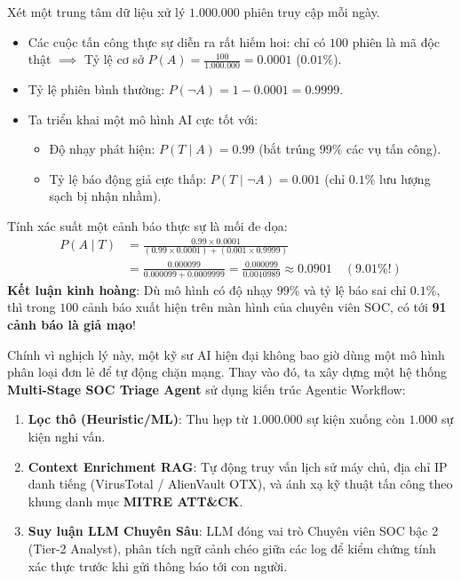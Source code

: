 \begin{example}
Xét một trung tâm dữ liệu xử lý $1.000.000$ phiên truy cập mỗi ngày.
\begin{itemize}
  \item Các cuộc tấn công thực sự diễn ra rất hiếm hoi: chỉ có $100$ phiên là mã độc thật $\implies$ Tỷ lệ cơ sở $P(A) = \frac{100}{1.000.000} = 0.0001$ ($0.01\%$).
  \item Tỷ lệ phiên bình thường: $P(\neg A) = 1 - 0.0001 = 0.9999$.
  \item Ta triển khai một mô hình AI cực tốt với:
    \begin{itemize}
      \item Độ nhạy phát hiện: $P(T \mid A) = 0.99$ (bắt trúng $99\%$ các vụ tấn công).
      \item Tỷ lệ báo động giả cực thấp: $P(T \mid \neg A) = 0.001$ (chỉ $0.1\%$ lưu lượng sạch bị nhận nhầm).
    \end{itemize}
\end{itemize}
Tính xác suất một cảnh báo thực sự là mối đe dọa:
\begin{align*}
P(A \mid T) &= \frac{0.99 \times 0.0001}{(0.99 \times 0.0001) + (0.001 \times 0.9999)} \\
&= \frac{0.000099}{0.000099 + 0.0009999} = \frac{0.000099}{0.0010989} \approx 0.0901 \quad (\mathbf{9.01\%}!)
\end{align*}
\textbf{Kết luận kinh hoàng}: Dù mô hình có độ nhạy $99\%$ và tỷ lệ báo sai chỉ $0.1\%$, thì trong $100$ cảnh báo xuất hiện trên màn hình của chuyên viên SOC, có tới \textbf{91 cảnh báo là giả mạo}!
\end{example}

Chính vì nghịch lý này, một kỹ sư AI hiện đại không bao giờ dùng một mô hình phân loại đơn lẻ để tự động chặn mạng. Thay vào đó, ta xây dựng một hệ thống \textbf{Multi-Stage SOC Triage Agent} sử dụng kiến trúc Agentic Workflow:
\begin{enumerate}
  \item \textbf{Lọc thô (Heuristic/ML)}: Thu hẹp từ $1.000.000$ sự kiện xuống còn $1.000$ sự kiện nghi vấn.
  \item \textbf{Context Enrichment RAG}: Tự động truy vấn lịch sử máy chủ, địa chỉ IP danh tiếng (VirusTotal / AlienVault OTX), và ánh xạ kỹ thuật tấn công theo khung danh mục \textbf{MITRE ATT\&CK}.
  \item \textbf{Suy luận LLM Chuyên Sâu}: LLM đóng vai trò Chuyên viên SOC bậc 2 (Tier-2 Analyst), phân tích ngữ cảnh chéo giữa các log để kiểm chứng tính xác thực trước khi gửi thông báo tới con người.
\end{enumerate}

